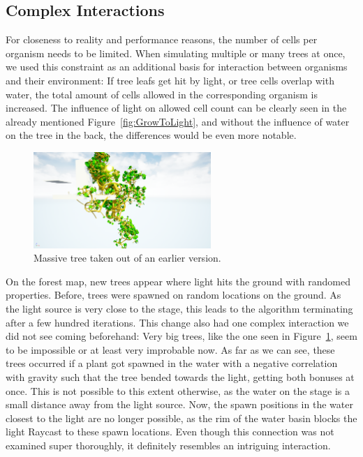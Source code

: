 \documentclass[11pt, abstract=on]{scrartcl}
\begin{document}
\subsection{Complex Interactions}

For closeness to reality and performance reasons, the number of cells per organism needs to be limited. When simulating multiple or many trees at once, we used this constraint as an additional basis for interaction between organisms and their environment: If tree leafs get hit by light, or tree cells overlap with water, the total amount of cells allowed in the corresponding organism is increased. The influence of light on allowed cell count can be clearly seen in the already mentioned Figure~\ref{fig:GrowToLight}, and without the influence of water on the tree in the back, the differences would be even more notable.

\begin{figure}
 	 \centering
 	    \includegraphics[width=0.6\textwidth]{SS_BIGTree.png}
 	 \caption{Massive tree taken out of an earlier version.}
 	 \label{fig:BIGTree}
\end{figure}

On the forest map, new trees appear where light hits the ground with randomed properties. Before, trees were spawned on random locations on the ground. As the light source is very close to the stage, this leads to the algorithm terminating after a few hundred iterations. This change also had one complex interaction we did not see coming beforehand: Very big trees, like the one seen in Figure~\ref{fig:BIGTree}, seem to be impossible or at least very improbable now. As far as we can see, these trees occurred if a plant got spawned in the water with a negative correlation with gravity such that the tree bended towards the light, getting both bonuses at once. This is not possible to this extent otherwise, as the water on the stage is a small distance away from the light source. Now, the spawn positions in the water closest to the light are no longer possible, as the rim of the water basin blocks the light Raycast to these spawn locations. Even though this connection was not examined super thoroughly, it definitely resembles an intriguing interaction.
\end{document}
